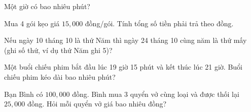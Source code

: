 \begin{ex} %
Một giờ có bao nhiêu phút?
\end{ex}

\begin{ex} %
Mua 4 gói kẹo giá $15,000$ đồng/gói. Tính tổng số tiền phải trả theo đồng.
\end{ex}

\begin{ex} %
Nếu ngày 10 tháng 10 là thứ Năm thì ngày 24 tháng 10 cùng năm là thứ mấy (ghi số thứ, ví dụ thứ Năm ghi 5)?
\end{ex}

\begin{ex} %
Một buổi chiếu phim bắt đầu lúc 19 giờ 15 phút và kết thúc lúc 21 giờ. Buổi chiếu phim kéo dài bao nhiêu phút?
\end{ex}

\begin{ex} %
Bạn Bình có $100,000$ đồng. Bình mua 3 quyển vở cùng loại và được thối lại $25,000$ đồng. Hỏi mỗi quyển vở giá bao nhiêu đồng?
\end{ex}

